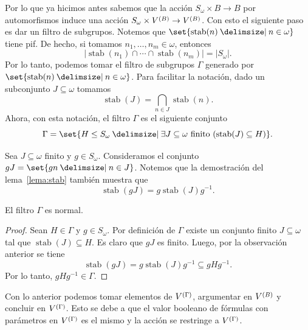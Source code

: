 \documentclass[letterpaper,DIV=15,12pt]{scrartcl}
\DeclareMathOperator{\stab}{stab}                          %
\newcommand{\st}{}
\newcommand{\SetSymbol}[1][]{%
\nonscript\:#1\vert
\allowbreak
\nonscript\:
\mathopen{}}
\renewcommand\st{\SetSymbol[\delimsize]}
\begin{document}
Por lo que ya hicimos antes sabemos que la acción \(S_{\omega}\times B\to B\)
por automorfismos induce una acción \(S_{\omega}\times\mb\to\mb\). Con esto el
siguiente paso es dar un filtro de subgrupos. Notemos que 
\(\set{\stab(n)\st n\in\omega}\) tiene pif. De hecho, si tomamos
\(n_1,\dots,n_m\in\omega\), entonces
\begin{equation*}
    \lvert\stab(n_1)\cap\cdots\cap\stab(n_m)\rvert = \lvert S_{\omega}\rvert.
\end{equation*}
Por lo tanto, podemos tomar el filtro de subgrupos \(\Gamma\) generado por
\(\set{\stab(n)\st n\in\omega}\). Para facilitar la notación, dado un
subconjunto \(J\subseteq\omega\) tomamos
\begin{equation*}
    \stab(J)=\bigcap_{n\in J}\stab(n).
\end{equation*}
Ahora, con esta notación, el filtro \(\Gamma\) es el siguiente conjunto
\begin{equation*}
    \Gamma=\set{H\leq S_{\omega}\st \exists J\subseteq\omega \text{ finito }
    (\stab(J)\subseteq H)}.
\end{equation*}

\begin{remark}
    Sea \(J\subseteq\omega\) finito y \(g\in S_{\omega}\). Consideramos el
    conjunto \(gJ=\set{gn\st n\in J}\).
    Notemos que la demostración del lema~\ref{lema:stab} también muestra que
    \begin{equation*}
        \stab(gJ)=g\stab(J)g^{-1}.
    \end{equation*}
\end{remark}

\begin{lemma}
    El filtro \(\Gamma\) es normal.
\end{lemma}
\begin{proof}
    Sean \(H\in\Gamma\) y \(g\in S_{\omega}\). Por definición de \(\Gamma\) existe un
    conjunto finito \(J\subseteq\omega\) tal que \(\stab(J)\subseteq H\). Es
    claro que \(gJ\) es finito. Luego, por la observación anterior se tiene
    \begin{equation*}
        \stab(gJ)=g\stab(J)g^{-1}\subseteq gHg^{-1}.
    \end{equation*}
    Por lo tanto, \(gHg^{-1}\in\Gamma\).
\end{proof}

Con lo anterior podemos tomar elementos de \(\mg\), argumentar en \(\mb\) y
concluir en \(\mg\). Esto se debe a que el valor booleano de fórmulas con
parámetros en \(\mg\) es el mismo y la acción se restringe a \(\mg\).
\end{document}
